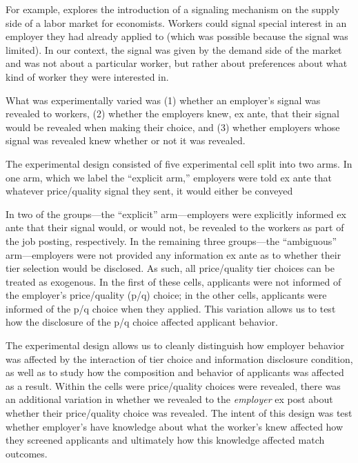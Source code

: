 For example, \cite{coles2013preference} explores the introduction of a signaling mechanism on the supply side of a labor market for economists.
Workers could signal special interest in an employer they had already applied to (which was possible because the signal was limited).
In our context, the signal was given by the demand side of the market and was not about a particular worker, but rather about preferences about what kind of worker they were interested in.



What was experimentally varied was
(1) whether an employer's signal was revealed to workers,
(2) whether the employers knew, ex ante, that their signal would be revealed when making their choice, and
(3) whether employers whose signal was revealed knew whether or not it was revealed.

The experimental design consisted of five experimental cell split into two arms.
In one arm, which we label the ``explicit arm,'' employers were told ex ante that whatever price/quality signal they sent, it would either be conveyed

In two of the groups---the ``explicit'' arm---employers were explicitly informed ex ante that their signal would, or would not, be revealed to the workers as part of the job posting, respectively.
In the remaining three groups---the ``ambiguous'' arm---employers were not provided any information ex ante as to whether their tier selection would be disclosed.
As such, all price/quality tier choices can be treated as exogenous.
In the first of these cells, applicants were not informed of the employer's price/quality (p/q) choice;
in the other cells, applicants were informed of the p/q choice when they applied.
This variation allows us to test how the disclosure of the p/q choice affected applicant behavior.

The experimental design allows us to cleanly distinguish how employer behavior was affected by the interaction of tier choice and information disclosure condition, as well as to study how the composition and behavior of applicants was affected as a result.
Within the cells were price/quality choices were revealed, there was an additional variation in whether we revealed to the {\em employer} ex post about whether their price/quality choice was revealed.
The intent of this design was test whether employer's have knowledge about what the worker's knew affected how they screened applicants and ultimately how this knowledge affected match outcomes.


